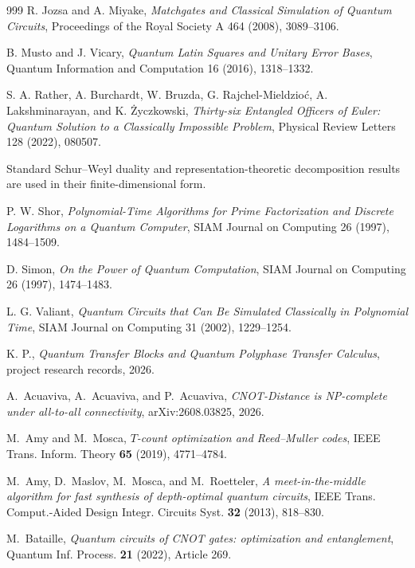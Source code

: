 \begin{thebibliography}{999}
R. Jozsa and A. Miyake,
\emph{Matchgates and Classical Simulation of Quantum Circuits},
Proceedings of the Royal Society A 464 (2008), 3089--3106.


B. Musto and J. Vicary,
\emph{Quantum Latin Squares and Unitary Error Bases},
Quantum Information and Computation 16 (2016), 1318--1332.


S. A. Rather, A. Burchardt, W. Bruzda, G. Rajchel-Mieldzio\'c, A. Lakshminarayan, and K. \.{Z}yczkowski,
\emph{Thirty-six Entangled Officers of Euler: Quantum Solution to a Classically Impossible Problem},
Physical Review Letters 128 (2022), 080507.


Standard Schur--Weyl duality and representation-theoretic decomposition results are used in their finite-dimensional form.


P. W. Shor,
\emph{Polynomial-Time Algorithms for Prime Factorization and Discrete Logarithms on a Quantum Computer},
SIAM Journal on Computing 26 (1997), 1484--1509.


D. Simon,
\emph{On the Power of Quantum Computation},
SIAM Journal on Computing 26 (1997), 1474--1483.


L. G. Valiant,
\emph{Quantum Circuits that Can Be Simulated Classically in Polynomial Time},
SIAM Journal on Computing 31 (2002), 1229--1254.


K. P.,
\emph{Quantum Transfer Blocks and Quantum Polyphase Transfer Calculus},
project research records, 2026.





A.~Acuaviva, A.~Acuaviva, and P.~Acuaviva,
\emph{CNOT-Distance is NP-complete under all-to-all connectivity},
arXiv:2608.03825, 2026.


M.~Amy and M.~Mosca,
\emph{$T$-count optimization and Reed--Muller codes},
IEEE Trans. Inform. Theory \textbf{65} (2019), 4771--4784.


M.~Amy, D.~Maslov, M.~Mosca, and M.~Roetteler,
\emph{A meet-in-the-middle algorithm for fast synthesis of depth-optimal quantum circuits},
IEEE Trans. Comput.-Aided Design Integr. Circuits Syst. \textbf{32} (2013), 818--830.


M.~Bataille,
\emph{Quantum circuits of CNOT gates: optimization and entanglement},
Quantum Inf. Process. \textbf{21} (2022), Article 269.



\end{thebibliography}
